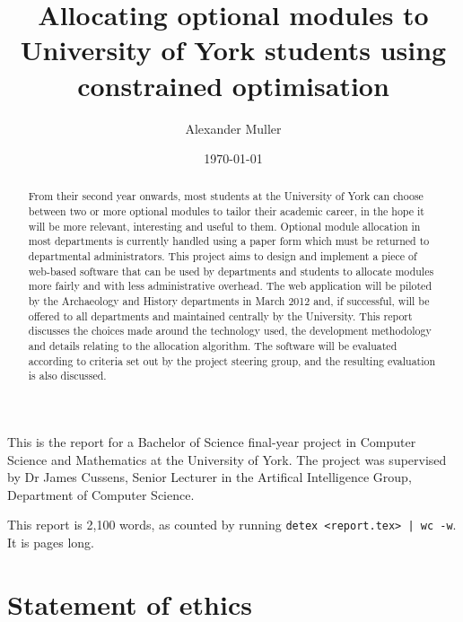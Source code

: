 \documentclass[]{scrartcl}
\title{Allocating optional modules to University of York students using constrained optimisation}
\author{Alexander Muller}
\date{\today}
\begin{document}
\ifpdf
{}
\else
{}
\fi

\maketitle

This is the report for a Bachelor of Science final-year project in Computer Science and Mathematics at the University of York. The project was supervised by Dr James Cussens, Senior Lecturer in the Artifical Intelligence Group, Department of Computer Science.

This report is 2,100 words, as counted by running \verb+detex <report.tex> | wc -w+. It is \pageref{LastPage} pages long.


\newpage

\begin{abstract}
  From their second year onwards, most students at the University of York can  choose between two or more optional modules to tailor their academic career, in the hope it will be more relevant, interesting and useful to them.
  Optional module allocation in most departments is currently handled using a paper form which must be returned to departmental administrators. This project aims to design and implement a piece of web-based software that can be used by departments and students to allocate modules more fairly and with less administrative overhead.
  The web application will be piloted by the Archaeology and History departments in March 2012 and, if successful, will be offered to all departments and maintained centrally by the University.
  This report discusses the choices made around the technology used, the development methodology and details relating to the allocation algorithm.
  The software will be evaluated according to criteria set out by the project steering group, and the resulting evaluation is also discussed.
\end{abstract}

\newpage

\tableofcontents

\newpage

\section{Statement of ethics}
\end{document}
